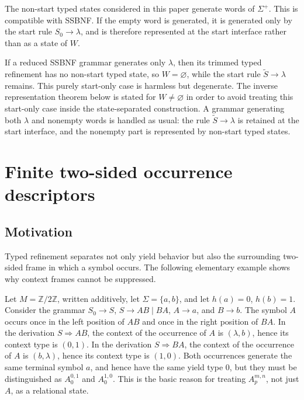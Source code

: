 \documentclass[sub]{jalc}
\begin{document}
\begin{remark}
\label{rem:edge-cases}
The non-start typed states considered in this paper generate words of \(\Sigma^+\). This is compatible with SSBNF. If the empty word is generated, it is generated only by the start rule \(S_0\to\lambda\), and is therefore represented at the start interface rather than as a state of \(W\).

If a reduced SSBNF grammar generates only \(\lambda\), then its trimmed typed refinement has no non-start typed state, so \(W=\varnothing\), while the start rule \(\widetilde S\to\lambda\) remains. This purely start-only case is harmless but degenerate. The inverse representation theorem below is stated for \(W\neq\varnothing\) in order to avoid treating this start-only case inside the state-separated construction. A grammar generating both \(\lambda\) and nonempty words is handled as usual: the rule \(\widetilde S\to\lambda\) is retained at the start interface, and the nonempty part is represented by non-start typed states.
\end{remark}

\section{Finite two-sided occurrence descriptors}
\label{sec:algebras}

\subsection{Motivation}

Typed refinement separates not only yield behavior but also the surrounding two-sided frame in which a symbol occurs. The following elementary example shows why context frames cannot be suppressed.

\begin{example}
\label{ex:two-frames}
Let \(M=\mathbb Z/2\mathbb Z\), written additively, let \(\Sigma=\{a,b\}\), and let \(h(a)=0\), \(h(b)=1\). Consider the grammar \(S_0\to S\), \(S\to AB\mid BA\), \(A\to a\), and \(B\to b\). The symbol \(A\) occurs once in the left position of \(AB\) and once in the right position of \(BA\). In the derivation \(S\Rightarrow AB\), the context of the occurrence of \(A\) is \((\lambda,b)\), hence its context type is \((0,1)\). In the derivation \(S\Rightarrow BA\), the context of the occurrence of \(A\) is \((b,\lambda)\), hence its context type is \((1,0)\). Both occurrences generate the same terminal symbol \(a\), and hence have the same yield type \(0\), but they must be distinguished as \(A_0^{0,1}\) and \(A_0^{1,0}\). This is the basic reason for treating \(A_p^{m,n}\), not just \(A\), as a relational state.
\end{example}
\end{document}
